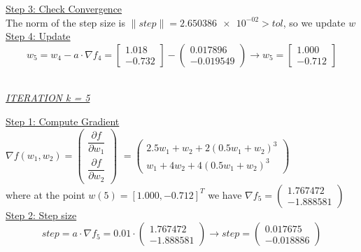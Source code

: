 \underline{Step 3: Check Convergence}\\
The norm of the step size is $\| step \| = \num{2.650386e-02} > tol$, so we update $w$
\\[4mm]

\underline{Step 4: Update}
\[ 
w_5 = w_4 - a\cdot \nabla f_4 =  \left[\begin{array}{c}
	1.018\\
	-0.732
\end{array}\right] - \left(\begin{array}{c}
	0.017896 \\
-0.019549
\end{array}\right) \rightarrow
w_5 = \left[\begin{array}{c}
	1.000\\
	-0.712
\end{array}\right]
\]
\\[4mm]

\begin{center}
	\underline{\textit{ITERATION k = 5}}
\end{center}

\underline{Step 1: Compute Gradient}\\
\(\nabla f(w_1,w_2) = \left(\begin{array}{c}
	\dfrac{\partial f}{\partial w_1} \\[4mm]
	\dfrac{\partial f}{\partial w_2}
\end{array}\right)\) $= \left(\begin{array}{c}
	2.5w_1 + w_2 + 2(0.5w_1+w_2)^3\\[1mm]
	w_1 + 4w_2 + 4(0.5w_1+w_2)^3
\end{array}\right)$ \\[3mm]

where at the point $w\left(5\right) = \left[1.000, -0.712\right]^T$ we have $\nabla f_{5} = \left(\begin{array}{c}
	1.767472 \\
	-1.888581
\end{array}\right)$
\\[4mm]

\underline{Step 2: Step size}
\[
step = a \cdot \nabla f_{5} = 0.01 \cdot \left(\begin{array}{c}
	1.767472 \\
-1.888581
\end{array}\right) \rightarrow step =\left(\begin{array}{c}
0.017675 \\
-0.018886
\end{array}\right)
\]
\\[4mm]


